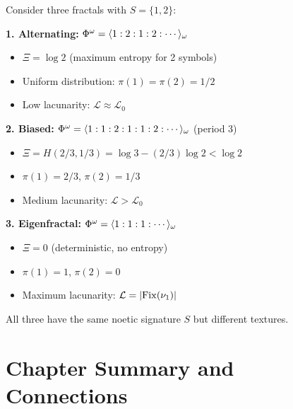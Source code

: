\begin{example}
\label{ex:lacunarity-comparison}
Consider three fractals with $S = \{1, 2\}$:

\textbf{1. Alternating:} $\Phi^{\omega} = \langle 1 : 2 : 1 : 2 : \cdots \rangle_\omega$
\begin{itemize}
  \item $\Xi = \log 2$ (maximum entropy for 2 symbols)
  \item Uniform distribution: $\pi(1) = \pi(2) = 1/2$
  \item Low lacunarity: $\mathcal{L} \approx \mathcal{L}_0$
\end{itemize}

\textbf{2. Biased:} $\Phi^{\omega} = \langle 1 : 1 : 2 : 1 : 1 : 2 : \cdots \rangle_\omega$ (period 3)
\begin{itemize}
  \item $\Xi = H(2/3, 1/3) = \log 3 - (2/3)\log 2 < \log 2$
  \item $\pi(1) = 2/3$, $\pi(2) = 1/3$
  \item Medium lacunarity: $\mathcal{L} > \mathcal{L}_0$
\end{itemize}

\textbf{3. Eigenfractal:} $\Phi^{\omega} = \langle 1 : 1 : 1 : \cdots \rangle_\omega$
\begin{itemize}
  \item $\Xi = 0$ (deterministic, no entropy)
  \item $\pi(1) = 1$, $\pi(2) = 0$
  \item Maximum lacunarity: $\mathcal{L} = |\mathrm{Fix}(\nu_{1})|$
\end{itemize}

All three have the same noetic signature $S$ but different textures.
\end{example}

\section{Chapter Summary and Connections}
\label{sec:ch4-summary}

